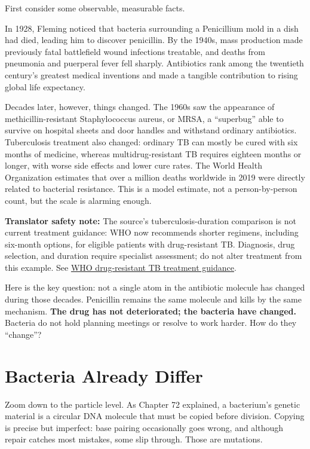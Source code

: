 First consider some observable, measurable facts.

In 1928, Fleming noticed that bacteria surrounding a Penicillium mold in a dish had died, leading him to discover penicillin. By the 1940s, mass production made previously fatal battlefield wound infections treatable, and deaths from pneumonia and puerperal fever fell sharply. Antibiotics rank among the twentieth century's greatest medical inventions and made a tangible contribution to rising global life expectancy.

Decades later, however, things changed. The 1960s saw the appearance of methicillin-resistant Staphylococcus aureus, or MRSA, a ``superbug'' able to survive on hospital sheets and door handles and withstand ordinary antibiotics. Tuberculosis treatment also changed: ordinary TB can mostly be cured with six months of medicine, whereas multidrug-resistant TB requires eighteen months or longer, with worse side effects and lower cure rates. The World Health Organization estimates that over a million deaths worldwide in 2019 were directly related to bacterial resistance. This is a model estimate, not a person-by-person count, but the scale is alarming enough.

\textbf{Translator safety note:} The source's tuberculosis-duration comparison is not current treatment guidance: WHO now recommends shorter regimens, including six-month options, for eligible patients with drug-resistant TB. Diagnosis, drug selection, and duration require specialist assessment; do not alter treatment from this example. See \href{https://tbksp.who.int/en/node/3032}{WHO drug-resistant TB treatment guidance}.

Here is the key question: not a single atom in the antibiotic molecule has changed during those decades. Penicillin remains the same molecule and kills by the same mechanism. \textbf{The drug has not deteriorated; the bacteria have changed.} Bacteria do not hold planning meetings or resolve to work harder. How do they ``change''?

\section{Bacteria Already Differ}

Zoom down to the particle level. As Chapter 72 explained, a bacterium's genetic material is a circular DNA molecule that must be copied before division. Copying is precise but imperfect: base pairing occasionally goes wrong, and although repair catches most mistakes, some slip through. Those are mutations.

